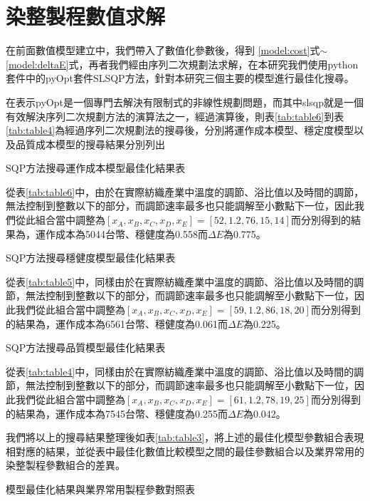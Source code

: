 \section{染整製程數值求解}
\label{c:6.2}
在前面數值模型建立中，我們帶入了數值化參數後，得到 \ref{model:cost}式$\sim$ \ref{model:deltaE}式，再者我們經由序列二次規劃法求解，在本研究我們使用python套件中的pyOpt套件SLSQP方法，針對本研究三個主要的模型進行最佳化搜尋。

在\cite{Perez.etc}表示pyOpt是一個專門去解決有限制式的非線性規劃問題，而其中slsqp就是一個有效解決序列二次規劃方法的演算法之一，經過演算後，則表\ref{tab:table6}到表\ref{tab:table4}為經過序列二次規劃法的搜尋後，分別將運作成本模型、穩定度模型以及品質成本模型的搜尋結果分別列出

\begin{table}[!htbp]
	\caption{SQP方法搜尋運作成本模型最佳化結果表}
	\center
	
	\label{tab:table6}
\end{table}

從表\ref{tab:table6}中，由於在實際紡織產業中溫度的調節、浴比值以及時間的調節，無法控制到整數以下的部分，而調節速率最多也只能調解至小數點下一位，因此我們從此組合當中調整為$[x_A,x_B,x_C,x_D,x_E]=[52,1.2,76,15,14]$而分別得到的結果為，運作成本為5044台幣、穩健度為0.558而$\Delta E$為0.775。

\begin{table}[!htbp]
	\caption{SQP方法搜尋穩健度模型最佳化結果表}
	\center
	
	\label{tab:table5}
\end{table}

從表\ref{tab:table5}中，同樣由於在實際紡織產業中溫度的調節、浴比值以及時間的調節，無法控制到整數以下的部分，而調節速率最多也只能調解至小數點下一位，因此我們從此組合當中調整為$[x_A,x_B,x_C,x_D,x_E]=[59,1.2,86,18,20]$而分別得到的結果為，運作成本為6561台幣、穩健度為0.061而$\Delta E$為0.225。

\begin{table}[!htbp]
	\caption{SQP方法搜尋品質模型最佳化結果表}
	\center
	
	\label{tab:table4}
\end{table}

從表\ref{tab:table4}中，同樣由於在實際紡織產業中溫度的調節、浴比值以及時間的調節，無法控制到整數以下的部分，而調節速率最多也只能調解至小數點下一位，因此我們從此組合當中調整為$[x_A,x_B,x_C,x_D,x_E]=[61,1.2,78,19,25]$而分別得到的結果為，運作成本為7545台幣、穩健度為0.255而$\Delta E$為0.042。

我們將以上的搜尋結果整理後如表\ref{tab:table3}，將上述的最佳化模型參數組合表現相對應的結果，並從表中最佳化數值比較模型之間的最佳參數組合以及業界常用的染整製程參數組合的差異。
\begin{table}[!htbp]
	\caption{模型最佳化結果與業界常用製程參數對照表}
	\center
	
	\label{tab:table3}
\end{table}